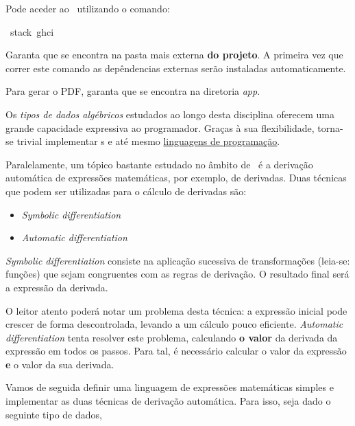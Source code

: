 \documentclass[a4paper]{article}
\begin{document}
Pode aceder ao \GHCi\ utilizando o comando:
\begin{tabbing}\ttfamily
~stack~ghci
\end{tabbing}

Garanta que se encontra na pasta mais externa \textbf{do projeto}.
A primeira vez que correr este comando as depêndencias externas serão instaladas automaticamente.

Para gerar o PDF, garanta que se encontra na diretoria \emph{app}.

\Problema

Os \emph{tipos de dados algébricos} estudados ao longo desta disciplina oferecem
uma grande capacidade expressiva ao programador. Graças à sua flexibilidade,
torna-se trivial implementar \DSL s
e até mesmo \href{http://www.cse.chalmers.se/~ulfn/papers/thesis.pdf}{linguagens de programação}.

Paralelamente, um tópico bastante estudado no âmbito de \DL\ 
é a derivação automática de expressões matemáticas, por exemplo, de derivadas.
Duas técnicas que podem ser utilizadas para o cálculo de derivadas são:

\begin{itemize}
\item \emph{Symbolic differentiation}
\item \emph{Automatic differentiation}
\end{itemize}

\emph{Symbolic differentiation} consiste na aplicação sucessiva de transformações
(leia-se: funções) que sejam congruentes com as regras de derivação. O resultado
final será a expressão da derivada.

O leitor atento poderá notar um problema desta técnica: a expressão
inicial pode crescer de forma descontrolada, levando a um cálculo pouco eficiente.
\emph{Automatic differentiation} tenta resolver este problema,
calculando \textbf{o valor} da derivada da expressão em todos os passos.
Para tal, é necessário calcular o valor da expressão \textbf{e} o valor da sua derivada.

Vamos de seguida definir uma linguagem de expressões matemáticas simples e
implementar as duas técnicas de derivação automática.
Para isso, seja dado o seguinte tipo de dados,
\end{document}
